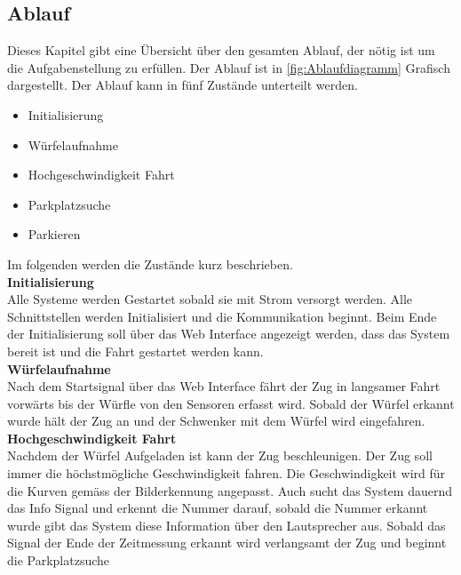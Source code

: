 \documentclass[../../main.tex]{subfiles}
\begin{document}
    \subsection{Ablauf} \label{ablauf}
    Dieses Kapitel gibt eine Übersicht über den gesamten Ablauf, der nötig ist um die Aufgabenstellung zu erfüllen. Der Ablauf ist in \ref{fig:Ablaufdiagramm} Grafisch dargestellt. Der Ablauf kann in fünf Zustände unterteilt werden.

    \begin{itemize}
        \item Initialisierung
        \item Würfelaufnahme
        \item Hochgeschwindigkeit Fahrt
        \item Parkplatzsuche
        \item Parkieren
    \end{itemize}

    Im folgenden werden die Zustände kurz beschrieben.\\  

    \textbf{Initialisierung}\\
    Alle Systeme werden Gestartet sobald sie mit Strom versorgt werden. Alle Schnittstellen werden Initialisiert und die Kommunikation beginnt. Beim Ende der Initialisierung soll über das Web Interface angezeigt werden, dass das System bereit ist und die Fahrt gestartet werden kann.\\

    \textbf{Würfelaufnahme}\\
    Nach dem Startsignal über das Web Interface fährt der Zug in langsamer Fahrt vorwärts bis der Würfle von den Sensoren erfasst wird. Sobald der Würfel erkannt wurde hält der Zug an und der Schwenker mit dem Würfel wird eingefahren.\\

    \textbf{Hochgeschwindigkeit Fahrt}\\
    Nachdem der Würfel Aufgeladen ist kann der Zug beschleunigen. Der Zug soll immer die höchstmögliche Geschwindigkeit fahren. Die Geschwindigkeit wird für die Kurven gemäss der Bilderkennung angepasst. Auch sucht das System dauernd
    das Info Signal und erkennt die Nummer darauf, sobald die Nummer erkannt wurde gibt das System diese Information
    über den Lautsprecher aus.
    Sobald das Signal der Ende der Zeitmessung erkannt wird verlangsamt der Zug und beginnt die Parkplatzsuche\\
\end{document}
